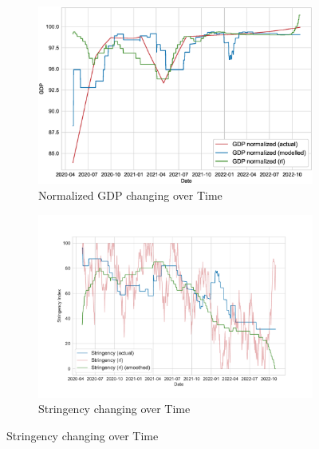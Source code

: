 \documentclass[tikz,fleqn,12pt]{wlscirep}
\begin{document}
\begin{figure}[htbp!]
  \begin{subfigure}[t]{0.48\textwidth}
    \centering
    \includegraphics[width=\linewidth]{images/914857/rl_gdp.eps}
    \caption{Normalized GDP changing over Time}
  \end{subfigure}
  \label{fig:914857_rl_gdp}
  \hfill
  \begin{subfigure}[t]{0.48\textwidth}
    \centering
    \includegraphics[width=\linewidth]{images/914857/rl_stringency.pdf}
    \caption{Stringency changing over Time}
  \end{subfigure}
  \label{fig:914857_rl_stringency}


\end{figure}
\end{document}
